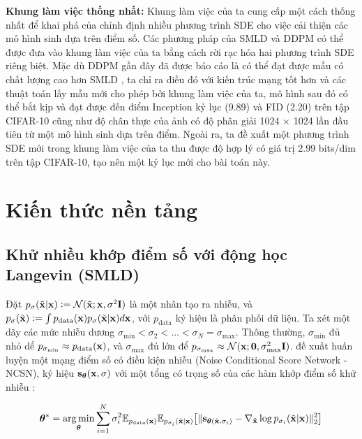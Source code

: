 \documentclass{article} %
\begin{document}
\textbf{Khung làm việc thống nhất:} Khung làm việc của ta cung cấp một cách thống nhất để khai phá của chỉnh định nhiều phương trình SDE cho việc cải thiện các mô hình sinh dựa trên điểm số.
Các phương pháp của SMLD và DDPM có thể được đưa vào khung làm việc của ta bằng cách rời rạc hóa hai phương trình SDE riêng biệt.
Mặc dù DDPM \citep{ho2020denoising} gần đây đã được báo cáo là có thể đạt được mẫu có chất lượng cao hơn SMLD \citep{song2019generative,song2020improved}, ta chỉ ra điều đó với kiến trúc mạng tốt hơn và các thuật toán lấy mẫu mới cho phép bởi khung làm việc của ta, mô hình sau đó có thể bắt kịp và đạt được đến điểm Inception kỷ lục (9.89) và FID (2.20) trên tập CIFAR-10 cũng như độ chân thực của ảnh có độ phân giải 1024 $\times$ 1024 lần đầu tiên từ một mô hình sinh dựa trên điểm.
Ngoài ra, ta đề xuất một phương trình SDE mới trong khung làm việc của ta thu được độ hợp lý có giá trị 2.99 bits/dim trên tập CIFAR-10, tạo nên một kỷ lục mới cho bài toán này.

\section{Kiến thức nền tảng}

\subsection{Khử nhiều khớp điểm số với động học Langevin (SMLD)}

Đặt $p_{\sigma}(\tilde{\bold{x}} \vert \bold{x}) \vcentcolon = \mathcal{N}(\tilde{\bold{x}};\bold{x}, \sigma^2 \bold{I})$ là một nhân tạo ra nhiễu, và $p_{\sigma}(\tilde{\bold{x}})\vcentcolon = \int p_{\mathrm{data}}(\bold{x}) p_{\sigma}(\tilde{\bold{x}} \vert \bold{x}) d \bold{x}$, với $p_{\mathrm{data}}$ ký hiệu là phân phối dữ liệu.
Ta xét một dãy các mức nhiễu dương $\sigma_{\min} < \sigma_2 < \dots < \sigma_N = \sigma_{\max}$.
Thông thường, $\sigma_{\min}$ đủ nhỏ dể $p_{\sigma_{\min}} \approx p_{\mathrm{data}}(\bold{x})$, và $\sigma_{\max}$ đủ lớn để $p_{\sigma_{\max}}\approx \mathcal{N}(\bold{x}; \bold{0}, \sigma_{\max}^2 \bold{I})$.
\citep{song2019generative} đề xuất huấn luyện một mạng điểm số có điều kiện nhiễu (Noise Conditional Score Network - NCSN), ký hiệu $\bold{s}_{\boldsymbol{\theta}}(\bold{x}, \sigma)$ với một tổng có trọng số của các hàm khớp điểm số khử nhiễu \citep{vincent2011connection}:

\begin{equation}
    \boldsymbol{\theta}^{\ast} = \operatorname*{arg\,min}_{\boldsymbol{\theta}} \sum_{i=1}^N \sigma_i^2 \mathbb{E}_{p_{\mathrm{data}}(\bold{x})} \mathbb{E}_{p_{\sigma_i}(\tilde{\bold{x}} \vert \bold{x})} \big\lbrack \lVert \bold{s}_{\boldsymbol{\theta} (\tilde{\bold{x}}, \sigma_i)} - \nabla_{\tilde{\bold{x}}} \log p_{\sigma_i} (\tilde{\bold{x}} \vert \bold{x})  \rVert_2^2 \big\rbrack
\end{equation}
\end{document}
